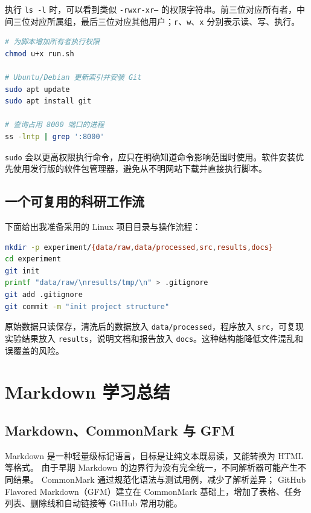 \documentclass[UTF8,zihao=-4,a4paper,fontset=windows]{ctexart}
\begin{document}
执行 \texttt{ls -l} 时，可以看到类似 \texttt{-rwxr-xr--} 的权限字符串。前三位对应所有者，中间三位对应所属组，最后三位对应其他用户；\texttt{r}、\texttt{w}、\texttt{x} 分别表示读、写、执行。

\begin{lstlisting}[language=bash,caption={权限与软件包管理示例}]
# 为脚本增加所有者执行权限
chmod u+x run.sh

# Ubuntu/Debian 更新索引并安装 Git
sudo apt update
sudo apt install git

# 查询占用 8000 端口的进程
ss -lntp | grep ':8000'
\end{lstlisting}

\texttt{sudo} 会以更高权限执行命令，应只在明确知道命令影响范围时使用。软件安装优先使用发行版的软件包管理器，避免从不明网站下载并直接执行脚本。

\subsection{一个可复用的科研工作流}

下面给出我准备采用的 Linux 项目目录与操作流程：

\begin{lstlisting}[language=bash,caption={建立规范的项目目录}]
mkdir -p experiment/{data/raw,data/processed,src,results,docs}
cd experiment
git init
printf "data/raw/\nresults/tmp/\n" > .gitignore
git add .gitignore
git commit -m "init project structure"
\end{lstlisting}

原始数据只读保存，清洗后的数据放入 \texttt{data/processed}，程序放入 \texttt{src}，可复现实验结果放入 \texttt{results}，说明文档和报告放入 \texttt{docs}。这种结构能降低文件混乱和误覆盖的风险。

\section{Markdown 学习总结}

\subsection{Markdown、CommonMark 与 GFM}

Markdown 是一种轻量级标记语言，目标是让纯文本既易读，又能转换为 HTML 等格式。
由于早期 Markdown 的边界行为没有完全统一，不同解析器可能产生不同结果。
CommonMark 通过规范化语法与测试用例，减少了解析差异；
GitHub Flavored Markdown（GFM）建立在 CommonMark 基础上，增加了表格、任务列表、删除线和自动链接等 GitHub 常用功能。
\end{document}
